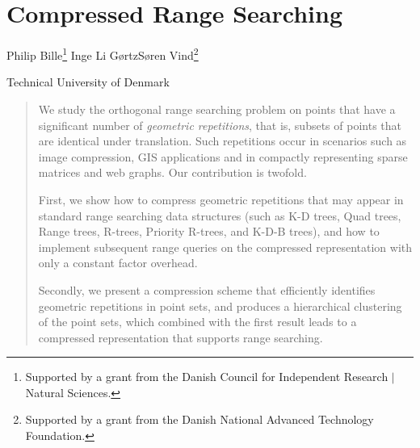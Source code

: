 \chapter{Compressed Range Searching}

\begin{infosection}
    \begin{authors}
        Philip Bille\footnote{Supported by a grant from the Danish Council for Independent Research $\vert$ Natural Sciences.} \qquad Inge Li G{\o}rtz\samethanks \qquad S{\o}ren Vind\footnote{Supported by a grant from the Danish National Advanced Technology Foundation.}
    \end{authors}

    \begin{uninames}
        Technical University of Denmark
    \end{uninames}

    \begin{abstract}
    We study the orthogonal range searching problem on points that have a significant number of \emph{geometric repetitions}, that is, subsets of points that are identical under translation. Such repetitions occur in scenarios such as image compression, GIS applications and in compactly representing sparse matrices and web graphs. Our contribution is twofold. 
    
    First, we show how to compress geometric repetitions that may appear in standard range searching data structures (such as K-D trees, Quad trees, Range trees, R-trees, Priority R-trees, and K-D-B trees), and how to implement subsequent range queries on the compressed representation with only a constant factor overhead. 
    
    Secondly, we present a compression scheme that efficiently identifies geometric repetitions in point sets, and produces a hierarchical clustering of the point sets, which combined with the first result leads to a compressed representation that supports range searching. 
    \end{abstract}
\end{infosection}


